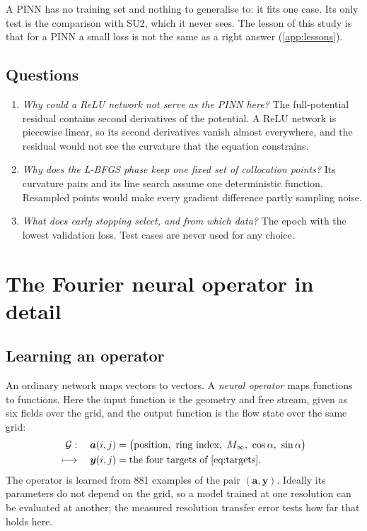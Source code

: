 A PINN has no training set and nothing to generalise to: it fits one case. Its only test is the
comparison with SU2, which it never sees. The lesson of this study is that for a PINN a small loss
is not the same as a right answer (\cref{app:lessons}).

\subsection*{Questions}
\begin{enumerate}[label=Q\arabic*., leftmargin=*]
\item \textit{Why could a ReLU network not serve as the PINN here?}\newline
The full-potential residual contains second derivatives of the potential. A ReLU network is
piecewise linear, so its second derivatives vanish almost everywhere, and the residual would not
see the curvature that the equation constrains.
\item \textit{Why does the L-BFGS phase keep one fixed set of collocation points?}\newline
Its curvature pairs and its line search assume one deterministic function. Resampled points would
make every gradient difference partly sampling noise.
\item \textit{What does early stopping select, and from which data?}\newline
The epoch with the lowest validation loss. Test cases are never used for any choice.
\end{enumerate}

\section{The Fourier neural operator in detail}
\label{app:fno}

\subsection{Learning an operator}

An ordinary network maps vectors to vectors. A \emph{neural operator} maps functions to functions.
Here the input function is the geometry and free stream, given as six fields over the grid, and the
output function is the flow state over the same grid:
\begin{equation}
\begin{aligned}
  \mathcal G:\quad \bm a(i,j) &= \bigl(\text{position},\ \text{ring index},\ \Ma,\ \cos\alpha,\ \sin\alpha\bigr)\\
  \longmapsto\quad \bm y(i,j) &= \text{the four targets of \cref{eq:targets}}.
\end{aligned}
\end{equation}
The operator is learned from 881 examples of the pair $(\bm a,\bm y)$. Ideally its parameters do
not depend on the grid, so a model trained at one resolution can be evaluated at another; the
measured resolution transfer error tests how far that holds here.

